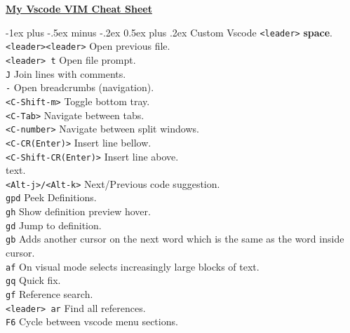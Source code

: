 \documentclass[10pt,landscape]{article}
\makeatletter
\renewcommand{\section}{\@startsection{section}{1}{0mm}%
                                {-1ex plus -.5ex minus -.2ex}%
                                {0.5ex plus .2ex}%
                                {\normalfont\large\bfseries}}
\makeatother
\begin{document}
\raggedright
\begin{multicols}{3}

\setlength{\columnseprule}{0.25pt}
\setlength{\premulticols}{1pt}
\setlength{\postmulticols}{1pt}
\setlength{\multicolsep}{1pt}
\setlength{\columnsep}{2pt}

\begin{center}
     \Large{\underline{\textbf{My Vscode VIM Cheat Sheet}}} \\
\end{center}

\section{Custom Vscode}
\verb!<leader>! \hfill \textbf{space}.\\
\verb!<leader><leader>! \hfill Open previous file.\\
\verb!<leader> t! \hfill Open file prompt.\\
\verb!J! \hfill Join lines with comments.\\
\verb!-! \hfill Open breadcrumbs (navigation).\\
\verb!<C-Shift-m>! \hfill Toggle bottom tray.\\
\verb!<C-Tab>! \hfill Navigate between tabs.\\
\verb!<C-number>! \hfill Navigate between split windows.\\
\verb!<C-CR(Enter)>! \hfill Insert line bellow.\\
\verb!<C-Shift-CR(Enter)>! \hfill Insert line above.\\
\verb!! \hfill text.\\
\verb!<Alt-j>/<Alt-k>! \hfill Next/Previous code suggestion.\\
\verb!gpd! \hfill Peek Definitions.\\
\verb!gh! \hfill Show definition preview hover.\\
\verb!gd! \hfill Jump to definition.\\
\verb!gb! \hfill Adds another cursor on the next word which is the same as the word inside cursor.\\
\verb!af! \hfill On visual mode selects increasingly large blocks of text.\\
\verb!gq! \hfill Quick fix.\\
\verb!gf! \hfill Reference search.\\
\verb!<leader> ar! \hfill Find all references.\\
\verb!F6! \hfill Cycle between vscode menu sections.\\


\end{multicols}
\end{document}
